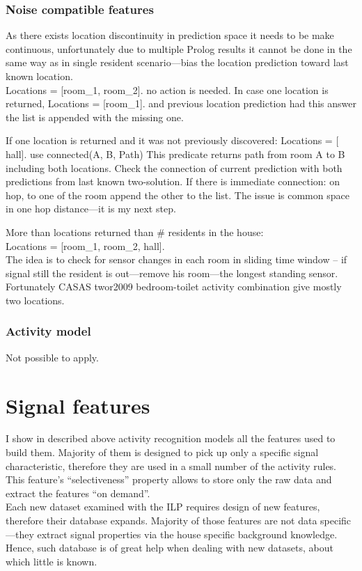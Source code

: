 \documentclass[10pt, a4paper, pdflatex, leqno, twoside, openright]{report}
\begin{document}
      \subsubsection{Noise compatible features}
As there exists location discontinuity in prediction space it needs to be make continuous, unfortunately due to multiple Prolog results it cannot be done in the same way as in single resident scenario—bias the location prediction toward last known location.\\

Locations = [room\_1, room\_2].
no action is needed. In case one location is returned,
Locations = [room\_1].
and previous location prediction had this answer the list is appended with the missing one.

If one location is returned and it was not previously discovered:
Locations = [ hall].
use
connected(A, B, Path)
This predicate returns path from room A to B including both locations. Check the connection of current prediction with both predictions from last known two-solution. If there is immediate connection: on hop, to one of the room append the other to the list. The issue is common space in one hop distance---it is my next step.

More than locations returned than \# residents in the house:\\
Locations = [room\_1, room\_2, hall].\\
The idea is to check for sensor changes in each room in sliding time window -- if signal still the resident is out---remove his room---the longest standing sensor.\\
Fortunately CASAS twor2009 bedroom-toilet activity combination give mostly two locations.

    \subsubsection{Activity model}
Not possible to apply.

  \section{Signal features\label{sec:single:features}\label{sec:multiple:features}}
I show in described above activity recognition models all the features used to build them. Majority of them is designed to pick up only a specific signal characteristic, therefore they are used in a small number of the activity rules. This feature's ``selectiveness'' property allows to store only the raw data and extract the features ``on demand''.\\
Each new dataset examined with the ILP requires design of new features, therefore their database expands. Majority of those features are not data specific---they extract signal properties via the house specific background knowledge. Hence, such database is of great help when dealing with new datasets, about which little is known.\\
\end{document}
